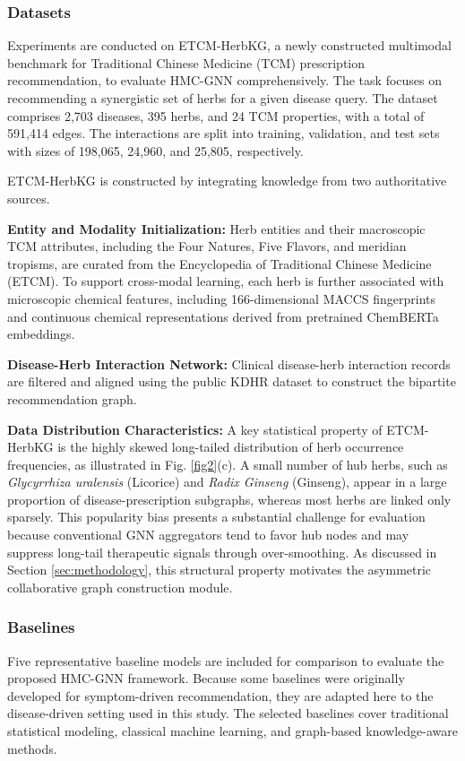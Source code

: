 \documentclass[a4paper,fleqn]{cas-dc}
\begin{document}
\subsubsection{Datasets}
Experiments are conducted on ETCM-HerbKG, a newly constructed multimodal benchmark for Traditional Chinese Medicine (TCM) prescription recommendation, to evaluate HMC-GNN comprehensively. The task focuses on recommending a synergistic set of herbs for a given disease query. The dataset comprises 2,703 diseases, 395 herbs, and 24 TCM properties, with a total of 591,414 edges. The interactions are split into training, validation, and test sets with sizes of 198,065, 24,960, and 25,805, respectively.

ETCM-HerbKG is constructed by integrating knowledge from two authoritative sources. 

\textbf{Entity and Modality Initialization:} Herb entities and their macroscopic TCM attributes, including the Four Natures, Five Flavors, and meridian tropisms, are curated from the Encyclopedia of Traditional Chinese Medicine (ETCM). To support cross-modal learning, each herb is further associated with microscopic chemical features, including 166-dimensional MACCS fingerprints and continuous chemical representations derived from pretrained ChemBERTa embeddings.

\textbf{Disease-Herb Interaction Network:} Clinical disease-herb interaction records are filtered and aligned using the public KDHR dataset to construct the bipartite recommendation graph.

\textbf{Data Distribution Characteristics:} A key statistical property of ETCM-HerbKG is the highly skewed long-tailed distribution of herb occurrence frequencies, as illustrated in Fig. \ref{fig2}(c). A small number of hub herbs, such as \textit{Glycyrrhiza uralensis} (Licorice) and \textit{Radix Ginseng} (Ginseng), appear in a large proportion of disease-prescription subgraphs, whereas most herbs are linked only sparsely. This popularity bias \cite{ref53} presents a substantial challenge for evaluation because conventional GNN aggregators tend to favor hub nodes and may suppress long-tail therapeutic signals through over-smoothing. As discussed in Section \ref{sec:methodology}, this structural property motivates the asymmetric collaborative graph construction module.

\subsubsection{Baselines}
Five representative baseline models are included for comparison to evaluate the proposed HMC-GNN framework. Because some baselines were originally developed for symptom-driven recommendation, they are adapted here to the disease-driven setting used in this study. The selected baselines cover traditional statistical modeling, classical machine learning, and graph-based knowledge-aware methods.
\end{document}

